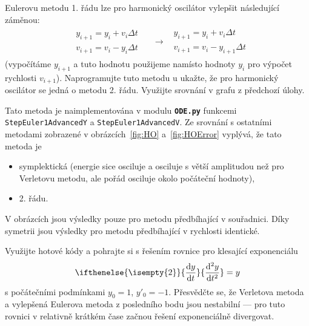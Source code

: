 \documentclass[a4paper,11pt,twoside]{article}
\renewcommand{\d}{\mathrm{d}}
\newcommand{\derivative}[3][]{\ifthenelse{\isempty{#1}}	    %
	{\frac{\d{#2}}{\d{#3}}}
	{\frac{\d^{#1}{#2}}{\d{#3}^{#1}}}
}
\def\code#1{\textnormal{\texttt{#1}}}
\def\file#1{\textnormal{\textbf{\texttt{#1}}}}
\begin{document}
    \begin{task}
        Eulerovu metodu 1. řádu lze pro harmonický oscilátor vylepšit následující záměnou:
        \begin{align}
            &\begin{matrix}
                y_{i+1}=y_{i}+v_{i}\Delta t \\
                v_{i+1}=v_{i}-y_{i}\Delta t 
            \end{matrix}
            &&\longrightarrow
            &\begin{matrix}
                y_{i+1}=y_{i}+v_{i}\Delta t \\
                v_{i+1}=v_{i}-y_{i+1}\Delta t 
            \end{matrix}
        \end{align}
        (vypočítáme $y_{i+1}$ a tuto hodnotu použijeme namísto hodnoty $y_{i}$ pro výpočet rychlosti $v_{i+1}$).
        Naprogramujte tuto metodu u ukažte, že pro harmonický oscilátor se jedná o metodu 2. řádu.
        Využijte srovnání v grafu z předchozí úlohy.
    \end{task}

    \begin{solution}
        Tato metoda je naimplementována v modulu \file{ODE.py} funkcemi \code{StepEuler1AdvancedY} a \code{StepEuler1AdvancedV}.
        Ze srovnání s ostatními metodami zobrazené v obrázcích~\ref{fig:HO} a~\ref{fig:HOError} vyplývá, že tato metoda je
        \begin{itemize}
        \item symplektická (energie sice osciluje a osciluje s větší amplitudou než pro Verletovu metodu, ale pořád osciluje okolo počáteční hodnoty),
        \item 2. řádu.
        \end{itemize}
        V obrázcích jsou výsledky pouze pro metodu předbíhající v souřadnici. 
        Díky symetrii jsou výsledky pro metodu předbíhající v rychlosti identické.
    \end{solution}

    \begin{task}
        Využijte hotové kódy a pohrajte si s řešením rovnice pro klesající exponenciálu
        \begin{equation}\label{eq:Exp}
            \derivative[2]{y}{t}=y
        \end{equation}
        s počátečními podmínkami $y_{0}=1$, $y'_{0}=-1$.
        Přesvědčte se, že Verletova metoda a vylepšená Eulerova metoda z posledního bodu jsou nestabilní --- pro tuto rovnici v relativně krátkém čase začnou řešení exponenciálně divergovat.
    \end{task}
\end{document}
